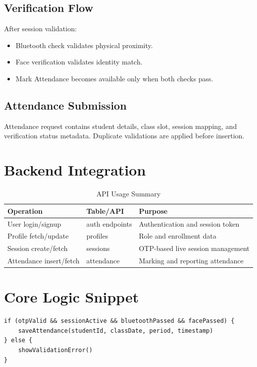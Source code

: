 \subsection{Verification Flow}
After session validation:
\begin{itemize}
\item Bluetooth check validates physical proximity.
\item Face verification validates identity match.
\item Mark Attendance becomes available only when both checks pass.
\end{itemize}

\subsection{Attendance Submission}
Attendance request contains student details, class slot, session mapping, and verification status metadata. Duplicate validations are applied before insertion.

\section{Backend Integration}
\begin{table}[H]
\centering
\caption{API Usage Summary}
\label{c5:tab1}
\begin{tabular}{|L{3.2cm}|L{3.0cm}|L{4.8cm}|}
\hline
\textbf{Operation} & \textbf{Table/API} & \textbf{Purpose}\\
\hline
User login/signup & auth endpoints & Authentication and session token\\
\hline
Profile fetch/update & profiles & Role and enrollment data\\
\hline
Session create/fetch & sessions & OTP-based live session management\\
\hline
Attendance insert/fetch & attendance & Marking and reporting attendance\\
\hline
\end{tabular}
\end{table}

\section{Core Logic Snippet}
\begin{lstlisting}
if (otpValid && sessionActive && bluetoothPassed && facePassed) {
    saveAttendance(studentId, classDate, period, timestamp)
} else {
    showValidationError()
}
\end{lstlisting}

